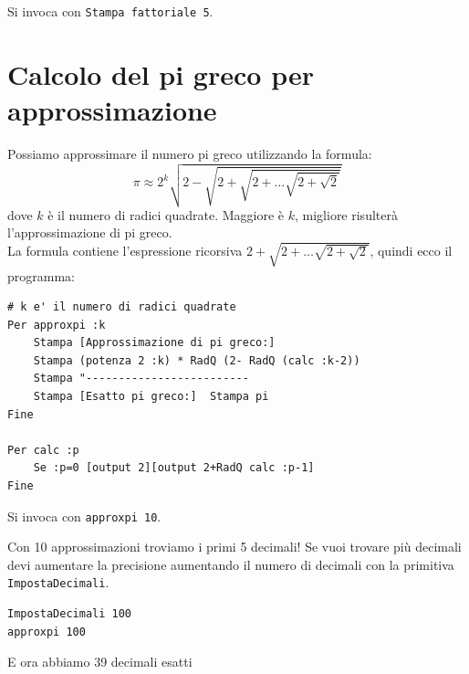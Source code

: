Si invoca con \texttt{Stampa fattoriale 5}.


\section{Calcolo del pi greco per approssimazione}
\label{approx-pi}

Possiamo approssimare il numero pi greco utilizzando la formula:
$$\pi\approx2^k\sqrt{2-\sqrt{2+\sqrt{2+\ldots\sqrt{2+\sqrt2}}}}$$ dove $k$ è il numero di radici quadrate. Maggiore è $k$, migliore risulterà l'approssimazione di pi greco.\\

La formula contiene l'espressione ricorsiva $2+\sqrt{2+\ldots\sqrt{2+\sqrt2}}$, quindi ecco il programma:
\begin{lstlisting}[caption="Approssimazione del valore del pi greco"]
# k e' il numero di radici quadrate
Per approxpi :k
	Stampa [Approssimazione di pi greco:]  
	Stampa (potenza 2 :k) * RadQ (2- RadQ (calc :k-2))
	Stampa "-------------------------
	Stampa [Esatto pi greco:]  Stampa pi
Fine

Per calc :p
	Se :p=0 [output 2][output 2+RadQ calc :p-1]
Fine
\end{lstlisting}

Si invoca con \texttt{approxpi 10}.


Con 10 approssimazioni troviamo i primi 5 decimali! Se vuoi trovare più decimali devi aumentare la precisione aumentando il numero di decimali con la primitiva \texttt{ImpostaDecimali}.
\begin{lstlisting}[caption="Il pi greco con 100 decimali"]
ImpostaDecimali 100
approxpi 100
\end{lstlisting}

E ora abbiamo 39 decimali esatti\textellipsis